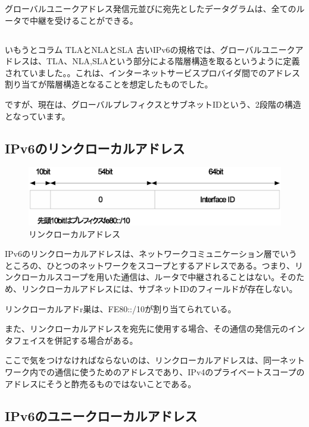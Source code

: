グローバルユニークアドレス発信元並びに宛先としたデータグラムは、全てのルータで中継を受けることができる。

\subsection*{}
\begin{itembox}[l]{いもうとコラム TLAとNLAとSLA}
古いIPv6の規格では、グローバルユニークアドレスは、TLA、NLA,SLAという部分による階層構造を取るというように定義されていました。。これは、インターネットサービスプロバイダ間でのアドレス割り当てが階層構造となることを想定したものでした。

ですが、現在は、グローバルプレフィクスとサブネットIDという、2段階の構造となっています。

\end{itembox}

\subsection{IPv6のリンクローカルアドレス}

\begin{figure}[htbp]
	\includegraphics[width=12cm,clip]{draw/lla.eps}
	\caption{リンクローカルアドレス}
	\label{fig:lla}
\end{figure}

IPv6のリンクローカルアドレスは、ネットワークコミュニケーション層でいうところの、ひとつのネットワークをスコープとするアドレスである。つまり、リンクローカルスコープを用いた通信は、ルータで中継されることはない。そのため、リンクローカルアドレスには、サブネットIDのフィールドが存在しない。

リンクローカルアドr巣は、FE80::/10が割り当てられている。

また、リンクローカルアドレスを宛先に使用する場合、その通信の発信元のインタフェイスを併記する場合がある。

ここで気をつけなければならないのは、リンクローカルアドレスは、同一ネットワーク内での通信に使うためのアドレスであり、IPv4のプライベートスコープのアドレスにそうと酢売るものではないことである。


\subsection{IPv6のユニークローカルアドレス}

